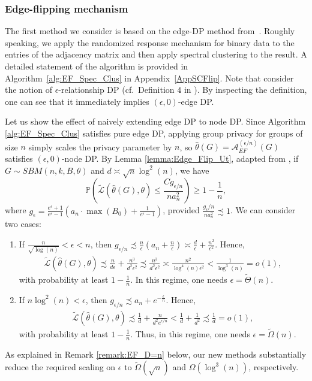 \documentclass{article}
\newcommand{\thetahat}{\ensuremath{\widehat{\theta}}}
\begin{document}
\subsubsection{Edge-flipping mechanism}

The first method we consider is based on the edge-DP method from~\cite{HehEtal22}. Roughly speaking, we apply the randomized response mechanism for binary data to the entries of the adjacency matrix and then apply spectral clustering to the result. A detailed statement of the algorithm is provided in Algorithm~\ref{alg:EF_Spec_Clus} in Appendix~\ref{AppSCFlip}. Note that \cite{HehEtal22} consider the notion of $\epsilon$-relationship DP (cf.\ Definition $4$ in \cite{HehEtal22}). By inspecting the definition, one can see that it immediately implies $(\epsilon, 0)$-edge DP.

Let us show the effect of naively extending edge DP to node DP. Since Algorithm \ref{alg:EF_Spec_Clus} satisfies pure edge DP, applying group privacy for groups of size $n$ simply scales the privacy parameter by $n$, so $\thetahat(G) = \mathcal{A}_{EF}^{(\epsilon/n)}(G)$ satisfies $(\epsilon, 0)$-node DP. 
By Lemma \ref{lemma:Edge_Flip_Ut}, adapted from \cite{HehEtal22}, if $G \sim SBM(n,k,B,\theta)$ and $d \asymp \sqrt{n}\log^2(n)$, we have
\begin{equation*}
\mathbb{P}\left(\widetilde{\mathcal{L}}\left(\thetahat(G), \theta\right) \leq\frac{Cg_{\epsilon/n}}{na_n^2}\right) \geq 1 - \frac{1}{n},
\end{equation*}
where $g_{\epsilon} = \frac{e^{\epsilon} + 1}{e^{\epsilon} - 1}\left(a_n \cdot\max(B_0) + \frac{1}{e^{\epsilon} - 1}\right)$, provided $\frac{g_\epsilon/n}{na_n^2} \precsim 1$. We can consider two cases:
\begin{enumerate}
\item If $\frac{n}{\sqrt{\log(n)}} < \epsilon < n$, then $g_{\epsilon/n} \precsim \frac{n}{\epsilon}\left(a_n + \frac{n}{\epsilon}\right) \asymp \frac{d}{\epsilon} + \frac{n^2}{\epsilon^2}$. Hence,
\begin{align*}
\widetilde{\mathcal{L}}\left(\thetahat(G), \theta\right) \precsim \frac{n}{d\epsilon} + \frac{n^3}{d^2\epsilon^2} \precsim \frac{n^3} {d^2\epsilon^2} \asymp \frac{n^2}{\log^4(n)\epsilon^2} < \frac{1}{\log^3(n)} = o(1),
\end{align*}
with probability at least $1 - \frac{1}{n}$. In this regime, one needs $\epsilon=\widetilde{\Theta}(n)$.
\item If $n\log^2(n) < \epsilon$, then $g_{\epsilon/n} \precsim a_n + e^{-\frac{\epsilon}{n}}$. Hence, 
\begin{align*}
\widetilde{\mathcal{L}}\left(\thetahat(G), \theta\right) \precsim \frac{1}{d} + \frac{n}{d^2e^{\epsilon/n}} < \frac{1}{d} + \frac{1}{d^2} \precsim \frac{1}{d} = o(1),
\end{align*}
with probability at least $1 - \frac{1}{n}$. Thus, in this regime, one needs $\epsilon=\widetilde{\Omega}(n)$.
\end{enumerate}
As explained in Remark \ref{remark:EF_D=n} below, our new methods substantially reduce the required scaling on $\epsilon$ to $\widetilde{\Omega}(\sqrt{n})$ and $\Omega(\log^3(n))$, respectively.
\end{document}
